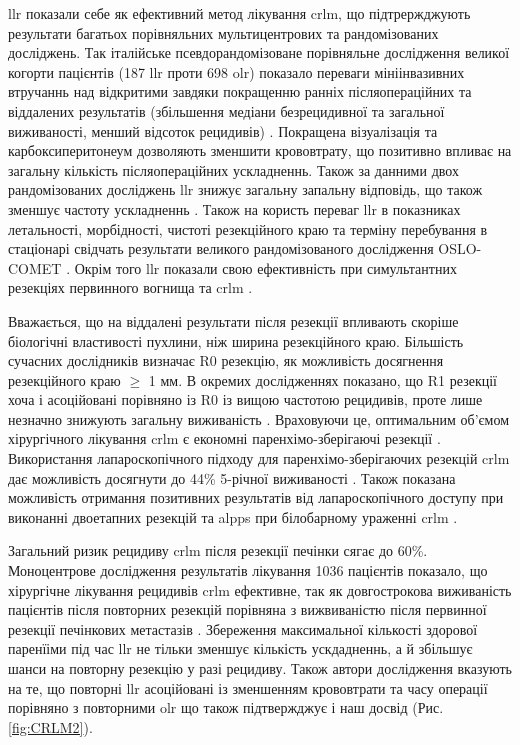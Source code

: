 \acrshort{llr} показали себе як ефективний метод лікування \acrshort{crlm}, що підтрержджують результати багатьох порівняльних мультицентрових та рандомізованих досліджень. Так італійське псевдорандомізоване порівняльне дослідження великої когорти пацієнтів (187 \acrshort{llr} проти 698 \acrshort{olr})  показало переваги мініінвазивних втручаннь над відкритими завдяки покращенню ранніх післяопераційних та віддалених результатів (збільшення медіани безрецидивної та загальної виживаності, менший відсоток рецидивів) \cite{Ratti2018a}. Покращена візуалізація та карбоксиперитонеум дозволяють зменшити крововтрату, що позитивно впливає на загальну кількість післяопераційних ускладненнь. Також за данними двох рандомізованих досліджень \acrshort{llr} знижує загальну запальну відповідь, що також зменшує частоту ускладненнь \cite{Kasai2018, Fretland2015}. Також на користь переваг \acrshort{llr} в показниках летальності, морбідності, чистоті резекційного краю та терміну перебування в стаціонарі свідчать результати великого рандомізованого дослідження OSLO-COMET \cite{Fretland2018a}. Окрім того \acrshort{llr} показали свою ефективність при симультантних резекціях первинного вогнища та \acrshort{crlm} \cite{Moris2019}.

Вважається, що на віддалені результати після резекції впливають скоріше біологічні властивості пухлини, ніж ширина резекційного краю. Більшість сучасних дослідників визначає R0 резекцію, як можливість досягнення резекційного краю $\geq$ 1 мм. В окремих дослідженнях показано, що R1 резекції хоча і асоційовані порівняно із R0 із вищою частотою рецидивів, проте лише незначно знижують загальну виживаність \cite{DeHaas2008}. Враховуючи це, оптимальним об'ємом хірургічного лікування \acrshort{crlm} є економні паренхімо-зберігаючі резекції \cite{Matsumura2016, Moris2017}. Використання лапароскопічного підходу для паренхімо-зберігаючих резекцій \acrshort{crlm} дає можливість досягнути до 44\% 5-річної виживаності \cite{Aghayan2018}. Також показана можливість отримання позитивних результатів від лапароскопічного доступу при виконанні двоетапних резекцій та \acrshort{alpps} при білобарному ураженні \acrshort{crlm} \cite{Okumura2019, Melandro2019}.

Загальний ризик рецидиву \acrshort{crlm} після резекції печінки сягає до 60\%. Моноцентрове дослідження результатів лікування 1036 пацієнтів показало, що хірургічне лікування рецидивів \acrshort{crlm} ефективне, так як  довгострокова виживаність пацієнтів після повторних резекцій порівняна з вижвиваністю після первинної резекції печінкових метастазів \cite{Wicherts2013}. Збереження максимальної кількості здорової паренїіми під час \acrshort{llr} не тільки зменшує кількість ускдадненнь, а й збільшує шанси на повторну резекцію у разі рецидиву. Також автори дослідження вказують на те, що повторні \acrshort{llr} асоційовані із зменшенням крововтрати та часу операції порівняно з повторними \acrshort{olr} що також підтвержджує і наш досвід (Рис. \ref{fig:CRLM2}).

